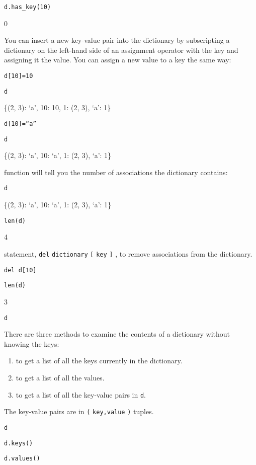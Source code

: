\texttt{d.has\_key(10)}

0

You can insert a new key-value pair
into the dictionary by subscripting a dictionary on the left-hand side
of an assignment operator with the key and assigning it the value. You
can assign a new value to a key the same way:


\texttt{d{[}10{]}=10}


\texttt{d}

\{(2, 3): `a', 10: 10, 1: (2, 3),
`a': 1\}


\texttt{d{[}10{]}=``a''}


\texttt{d}

\{(2, 3): `a', 10: `a', 1: (2, 3),
`a': 1\}

 function will tell
you the number of associations the dictionary contains:


\texttt{d}

\{(2, 3): `a', 10: `a', 1: (2, 3),
`a': 1\}


\texttt{len(d)}

4


statement, \texttt{del} \texttt{dictionary} \texttt{{[}} \texttt{key} \texttt{{]}}
, to remove associations from the dictionary.


\texttt{del d{[}10{]}}


\texttt{len(d)}

3


\texttt{d}



There are three methods to examine
the contents of a dictionary without knowing the keys:

\begin{enumerate}

\item
   to get a
  list of all the keys currently in the dictionary.
\item
   to get a
  list of all the values.
\item
   to get a
  list of all the key-value pairs in \texttt{d}.
\end{enumerate}

The key-value pairs are in
\texttt{(} \texttt{key,value} \texttt{)} tuples.


\texttt{d}




\texttt{d.keys()}




\texttt{d.values()}




